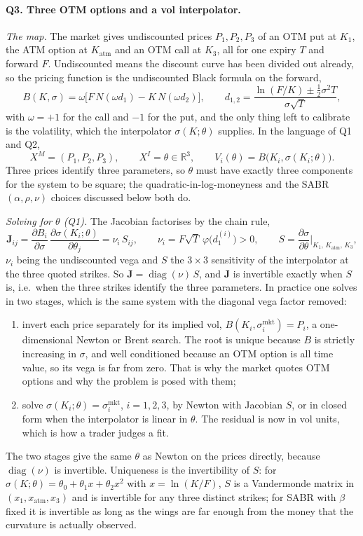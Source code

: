 \documentclass[11pt]{article}
\newcommand{\XI}{X^{I}}
\newcommand{\XM}{X^{M}}
\newcommand{\J}{\mathbf{J}}
\DeclareMathOperator{\diag}{diag}
\begin{document}
\paragraph{Q3. Three OTM options and a vol interpolator.}
\emph{The map.} The market gives undiscounted prices $P_1,P_2,P_3$ of an OTM put at $K_1$, the ATM option at $K_{\mathrm{atm}}$ and an OTM call at $K_3$, all for one expiry $T$ and forward $F$. Undiscounted means the discount curve has been divided out already, so the pricing function is the undiscounted Black formula on the forward,
\[
B(K,\sigma)=\omega\bigl[F\,N(\omega d_1)-K\,N(\omega d_2)\bigr],
\qquad
d_{1,2}=\frac{\ln(F/K)\pm\tfrac12\sigma^2T}{\sigma\sqrt T},
\]
with $\omega=+1$ for the call and $-1$ for the put, and the only thing left to calibrate is the volatility, which the interpolator $\sigma(K;\theta)$ supplies. In the language of Q1 and Q2,
\[
\XM=(P_1,P_2,P_3),\qquad \XI=\theta\in\mathbb{R}^3,\qquad V_i(\theta)=B\bigl(K_i,\sigma(K_i;\theta)\bigr).
\]
Three prices identify three parameters, so $\theta$ must have exactly three components for the system to be square; the quadratic-in-log-moneyness and the SABR $(\alpha,\rho,\nu)$ choices discussed below both do.

\emph{Solving for $\theta$ (Q1).} The Jacobian factorises by the chain rule,
\[
\J_{ij}=\frac{\partial B_i}{\partial\sigma}\,\frac{\partial\sigma(K_i;\theta)}{\partial\theta_j}=\nu_i\,S_{ij},
\qquad
\nu_i=F\sqrt T\,\varphi\bigl(d_1^{(i)}\bigr)>0,
\qquad
S=\frac{\partial\sigma}{\partial\theta}\Big|_{K_1,\,K_{\mathrm{atm}},\,K_3},
\]
$\nu_i$ being the undiscounted vega and $S$ the $3\times3$ sensitivity of the interpolator at the three quoted strikes. So $\J=\diag(\nu)\,S$, and $\J$ is invertible exactly when $S$ is, i.e.\ when the three strikes identify the three parameters. In practice one solves in two stages, which is the same system with the diagonal vega factor removed:
\begin{enumerate}[leftmargin=*]
\item invert each price separately for its implied vol, $B(K_i,\sigma_i^{\mathrm{mkt}})=P_i$, a one-dimensional Newton or Brent search. The root is unique because $B$ is strictly increasing in $\sigma$, and well conditioned because an OTM option is all time value, so its vega is far from zero. That is why the market quotes OTM options and why the problem is posed with them;
\item solve $\sigma(K_i;\theta)=\sigma_i^{\mathrm{mkt}}$, $i=1,2,3$, by Newton with Jacobian $S$, or in closed form when the interpolator is linear in $\theta$. The residual is now in vol units, which is how a trader judges a fit.
\end{enumerate}
The two stages give the same $\theta$ as Newton on the prices directly, because $\diag(\nu)$ is invertible. Uniqueness is the invertibility of $S$: for $\sigma(K;\theta)=\theta_0+\theta_1x+\theta_2x^2$ with $x=\ln(K/F)$, $S$ is a Vandermonde matrix in $(x_1,x_{\mathrm{atm}},x_3)$ and is invertible for any three distinct strikes; for SABR with $\beta$ fixed it is invertible as long as the wings are far enough from the money that the curvature is actually observed.
\end{document}

